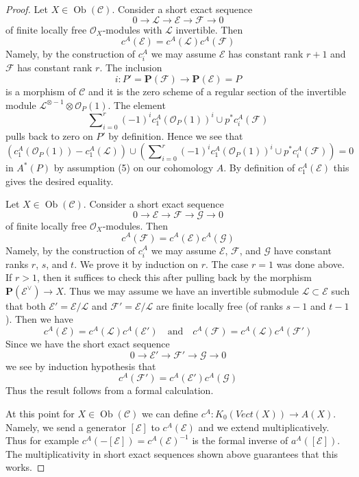 \documentclass[10pt,a4paper]{amsart}
\theoremstyle{plain}
\theoremstyle{definition}
\theoremstyle{remark}
\numberwithin{equation}{subsection}
\def\Ob{\mathop{\mathrm{Ob}}\nolimits}
\begin{document}
\begin{proof}
\medskip\noindent
Let $X \in \Ob(\mathcal{C})$. Consider a short exact sequence
$$
0 \to \mathcal{L} \to \mathcal{E} \to \mathcal{F} \to 0
$$
of finite locally free $\mathcal{O}_X$-modules with $\mathcal{L}$ invertible.
Then
$$
c^A(\mathcal{E}) = c^A(\mathcal{L}) c^A(\mathcal{F})
$$
Namely, by the construction of $c^A_i$ we may assume $\mathcal{E}$ has
constant rank $r + 1$ and $\mathcal{F}$ has constant rank $r$.
The inclusion
$$
i : P' = \mathbf{P}(\mathcal{F}) \longrightarrow \mathbf{P}(\mathcal{E}) = P
$$
is a morphism of $\mathcal{C}$ and it is the zero scheme of a regular
section of the invertible module
$\mathcal{L}^{\otimes -1} \otimes \mathcal{O}_P(1)$.
The element
$$
\sum\nolimits_{i = 0}^r (-1)^i c_1^A(\mathcal{O}_P(1))^i \cup
p^*c^A_i(\mathcal{F})
$$
pulls back to zero on $P'$ by definition. Hence we see that
$$
\left(c_1^A(\mathcal{O}_P(1)) - c_1^A(\mathcal{L})\right) \cup
\left(\sum\nolimits_{i = 0}^r (-1)^i c_1^A(\mathcal{O}_P(1))^i \cup
p^*c^A_i(\mathcal{F})\right) = 0
$$
in $A^*(P)$ by assumption (5) on our cohomology $A$.
By definition of $c_1^A(\mathcal{E})$
this gives the desired equality.

\medskip\noindent
Let $X \in \Ob(\mathcal{C})$. Consider a short exact sequence
$$
0 \to \mathcal{E} \to \mathcal{F} \to \mathcal{G} \to 0
$$
of finite locally free $\mathcal{O}_X$-modules. Then
$$
c^A(\mathcal{F}) = c^A(\mathcal{E}) c^A(\mathcal{G})
$$
Namely, by the construction of $c^A_i$ we may assume
$\mathcal{E}$, $\mathcal{F}$, and $\mathcal{G}$ have
constant ranks $r$, $s$, and $t$. We prove it by induction on $r$.
The case $r = 1$ was done above. If $r > 1$, then it suffices to check
this after pulling back by the morphism $\mathbf{P}(\mathcal{E}^\vee) \to X$.
Thus we may assume we have an invertible submodule
$\mathcal{L} \subset \mathcal{E}$ such that both
$\mathcal{E}' = \mathcal{E}/\mathcal{L}$ and
$\mathcal{F}' = \mathcal{E}/\mathcal{L}$ are finite locally free
(of ranks $s - 1$ and $t - 1$). Then we have
$$
c^A(\mathcal{E}) = c^A(\mathcal{L}) c^A(\mathcal{E}')
\quad\text{and}\quad
c^A(\mathcal{F}) = c^A(\mathcal{L}) c^A(\mathcal{F}')
$$
Since we have the short exact sequence
$$
0 \to \mathcal{E}' \to \mathcal{F}' \to \mathcal{G} \to 0
$$
we see by induction hypothesis that
$$
c^A(\mathcal{F}') = c^A(\mathcal{E}') c^A(\mathcal{G})
$$
Thus the result follows from a formal calculation.

\medskip\noindent
At this point for $X \in \Ob(\mathcal{C})$
we can define $c^A : K_0(\textit{Vect}(X)) \to A(X)$.
Namely, we send a generator $[\mathcal{E}]$ to $c^A(\mathcal{E})$
and we extend multiplicatively. Thus for example
$c^A(-[\mathcal{E}]) = c^A(\mathcal{E})^{-1}$ is the formal
inverse of $a^A([\mathcal{E}])$.
The multiplicativity in short exact sequences shown above
guarantees that this works.


\end{proof}
\end{document}
